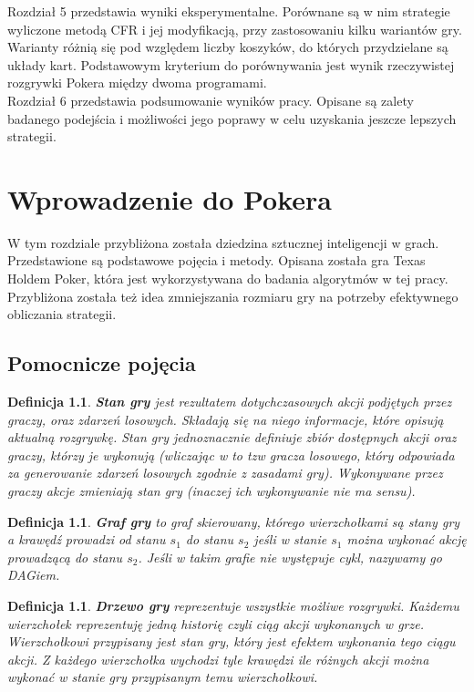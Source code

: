 \documentclass[licencjacka]{pracamgr}
\newtheorem{definition}[theorem]{Definicja}
\begin{document}
\noindent
Rozdział 5 przedstawia wyniki eksperymentalne. Porównane są w nim strategie wyliczone metodą
CFR i jej modyfikacją, przy zastosowaniu kilku wariantów gry. Warianty różnią się pod względem
liczby koszyków, do których przydzielane są układy kart. Podstawowym kryterium
do porównywania jest wynik rzeczywistej rozgrywki Pokera między dwoma programami. \\

\noindent
Rozdział 6 przedstawia podsumowanie wyników pracy. Opisane są zalety badanego podejścia
i możliwości jego poprawy w celu uzyskania jeszcze lepszych strategii.

\chapter{Wprowadzenie do Pokera}

\noindent
W tym rozdziale przybliżona została dziedzina sztucznej inteligencji w grach. Przedstawione
są podstawowe pojęcia i metody. Opisana została gra Texas Holdem Poker, która jest
wykorzystywana do badania algorytmów w tej pracy. Przybliżona została też idea
zmniejszania rozmiaru gry na potrzeby efektywnego obliczania strategii.

\section{Pomocnicze pojęcia}

\begin{definition}
      \textbf{Stan gry} jest rezultatem dotychczasowych akcji podjętych przez graczy, oraz zdarzeń losowych.
      Składają się na niego informacje, które opisują aktualną rozgrywkę.
      Stan gry jednoznacznie definiuje zbiór dostępnych
      akcji oraz graczy, którzy je wykonują (wliczając w to tzw gracza losowego, który odpowiada
      za generowanie zdarzeń losowych zgodnie z zasadami gry). Wykonywane przez graczy akcje
      zmieniają stan gry (inaczej ich wykonywanie nie ma sensu).
\end{definition}

\begin{definition}
      \textbf{Graf gry} to graf skierowany, którego wierzchołkami są stany gry a krawędź prowadzi od stanu
      $s_1$ do stanu $s_2$ jeśli w stanie $s_1$ można wykonać akcję prowadzącą do stanu
      $s_2$. Jeśli w takim grafie nie występuje cykl, nazywamy go DAGiem.
\end{definition}

\begin{definition}
      \textbf{Drzewo gry} reprezentuje wszystkie możliwe rozgrywki. Każdemu wierzchołek reprezentuję jedną historię
      czyli ciąg akcji wykonanych w grze. Wierzchołkowi przypisany jest stan gry, który jest efektem
      wykonania tego ciągu akcji. Z każdego wierzchołka wychodzi tyle krawędzi ile różnych
      akcji można wykonać w stanie gry przypisanym temu wierzchołkowi.
\end{definition}
\end{document}
